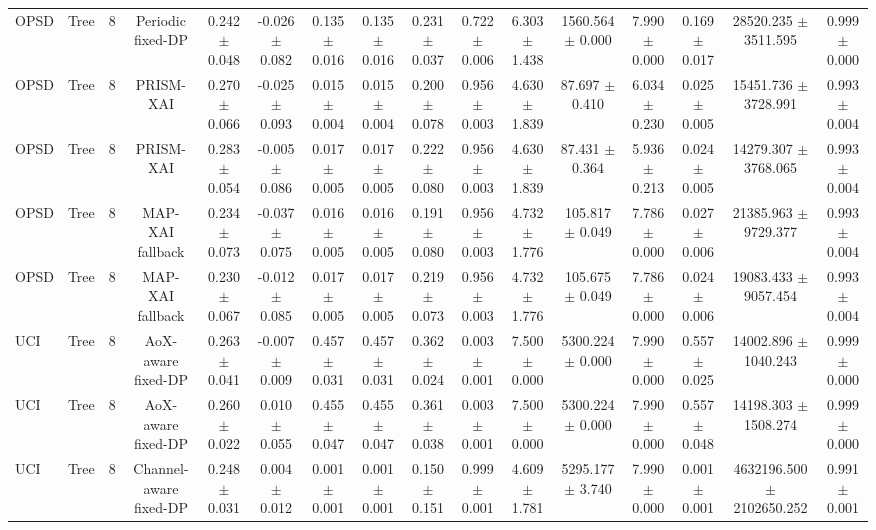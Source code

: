 \begin{tabular}{lccccccccccccccc}
OPSD & Tree & 8 & Periodic fixed-DP & 0.242 $\pm$ 0.048 & -0.026 $\pm$ 0.082 & 0.135 $\pm$ 0.016 & 0.135 $\pm$ 0.016 & 0.231 $\pm$ 0.037 & 0.722 $\pm$ 0.006 & 6.303 $\pm$ 1.438 & 1560.564 $\pm$ 0.000 & 7.990 $\pm$ 0.000 & 0.169 $\pm$ 0.017 & 28520.235 $\pm$ 3511.595 & 0.999 $\pm$ 0.000 \\
OPSD & Tree & 8 & PRISM-XAI & 0.270 $\pm$ 0.066 & -0.025 $\pm$ 0.093 & 0.015 $\pm$ 0.004 & 0.015 $\pm$ 0.004 & 0.200 $\pm$ 0.078 & 0.956 $\pm$ 0.003 & 4.630 $\pm$ 1.839 & 87.697 $\pm$ 0.410 & 6.034 $\pm$ 0.230 & 0.025 $\pm$ 0.005 & 15451.736 $\pm$ 3728.991 & 0.993 $\pm$ 0.004 \\
OPSD & Tree & 8 & PRISM-XAI & 0.283 $\pm$ 0.054 & -0.005 $\pm$ 0.086 & 0.017 $\pm$ 0.005 & 0.017 $\pm$ 0.005 & 0.222 $\pm$ 0.080 & 0.956 $\pm$ 0.003 & 4.630 $\pm$ 1.839 & 87.431 $\pm$ 0.364 & 5.936 $\pm$ 0.213 & 0.024 $\pm$ 0.005 & 14279.307 $\pm$ 3768.065 & 0.993 $\pm$ 0.004 \\
OPSD & Tree & 8 & MAP-XAI fallback & 0.234 $\pm$ 0.073 & -0.037 $\pm$ 0.075 & 0.016 $\pm$ 0.005 & 0.016 $\pm$ 0.005 & 0.191 $\pm$ 0.080 & 0.956 $\pm$ 0.003 & 4.732 $\pm$ 1.776 & 105.817 $\pm$ 0.049 & 7.786 $\pm$ 0.000 & 0.027 $\pm$ 0.006 & 21385.963 $\pm$ 9729.377 & 0.993 $\pm$ 0.004 \\
OPSD & Tree & 8 & MAP-XAI fallback & 0.230 $\pm$ 0.067 & -0.012 $\pm$ 0.085 & 0.017 $\pm$ 0.005 & 0.017 $\pm$ 0.005 & 0.219 $\pm$ 0.073 & 0.956 $\pm$ 0.003 & 4.732 $\pm$ 1.776 & 105.675 $\pm$ 0.049 & 7.786 $\pm$ 0.000 & 0.024 $\pm$ 0.006 & 19083.433 $\pm$ 9057.454 & 0.993 $\pm$ 0.004 \\
UCI & Tree & 8 & AoX-aware fixed-DP & 0.263 $\pm$ 0.041 & -0.007 $\pm$ 0.009 & 0.457 $\pm$ 0.031 & 0.457 $\pm$ 0.031 & 0.362 $\pm$ 0.024 & 0.003 $\pm$ 0.001 & 7.500 $\pm$ 0.000 & 5300.224 $\pm$ 0.000 & 7.990 $\pm$ 0.000 & 0.557 $\pm$ 0.025 & 14002.896 $\pm$ 1040.243 & 0.999 $\pm$ 0.000 \\
UCI & Tree & 8 & AoX-aware fixed-DP & 0.260 $\pm$ 0.022 & 0.010 $\pm$ 0.055 & 0.455 $\pm$ 0.047 & 0.455 $\pm$ 0.047 & 0.361 $\pm$ 0.038 & 0.003 $\pm$ 0.001 & 7.500 $\pm$ 0.000 & 5300.224 $\pm$ 0.000 & 7.990 $\pm$ 0.000 & 0.557 $\pm$ 0.048 & 14198.303 $\pm$ 1508.274 & 0.999 $\pm$ 0.000 \\
UCI & Tree & 8 & Channel-aware fixed-DP & 0.248 $\pm$ 0.031 & 0.004 $\pm$ 0.012 & 0.001 $\pm$ 0.001 & 0.001 $\pm$ 0.001 & 0.150 $\pm$ 0.151 & 0.999 $\pm$ 0.001 & 4.609 $\pm$ 1.781 & 5295.177 $\pm$ 3.740 & 7.990 $\pm$ 0.000 & 0.001 $\pm$ 0.001 & 4632196.500 $\pm$ 2102650.252 & 0.991 $\pm$ 0.001 \\

\end{tabular}
